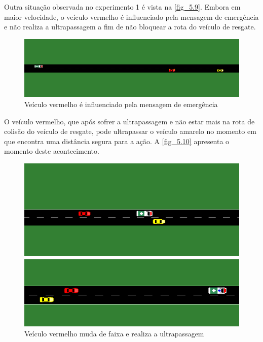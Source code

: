 \documentclass[
12pt,				%
openright,			%
oneside,			%
a4paper,			%
brazil,				%
]{abntex2}
\begin{document}
	\par Outra situação observada no experimento 1 é vista na \autoref{fig_5.9}. Embora em maior velocidade, o veículo vermelho é influenciado pela mensagem de emergência e não realiza a ultrapassagem a fim de não bloquear a rota do veículo de resgate.
	
	\begin{figure}[H]
		\centering
		\includegraphics[scale=.4]{figuras/cap5/59Experimento1SUMO4}
		\caption{\label{fig_5.9}Veículo vermelho é influenciado pela mensagem de emergência}
	\end{figure}
	
	\par O veículo vermelho, que após sofrer a ultrapassagem e não estar mais na rota de colisão do veículo de resgate, pode ultrapassar o veículo amarelo no momento em que encontra uma distância segura para a ação. A \autoref{fig_5.10} apresenta o momento deste acontecimento.
	
	\begin{figure}[H]
		\centering
		\includegraphics[scale=.5]{figuras/cap5/510Experimento1SUMO5}
		\caption{\label{fig_5.10}Veículo vermelho muda de faixa e realiza a ultrapassagem}
	\end{figure}
		
\end{document}
